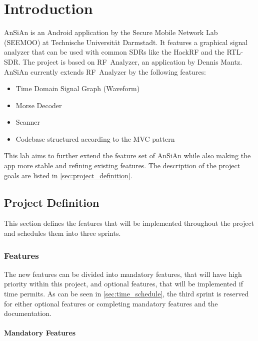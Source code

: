 \chapter{Introduction}\label{ch:introduction}
\glsresetall %

\ac{AnSiAn} is an Android application by the Secure Mobile Network Lab (SEEMOO) at 
Technische Universität Darmstadt. It features a graphical signal analyzer that can be used with common \acp{SDR} like the
HackRF and the RTL-SDR. The project is based on RF~Analyzer, an application by
Dennis Mantz. \ac{AnSiAn} currently extends RF~Analyzer by the following features: 
\begin{itemize}
	\item Time Domain Signal Graph (Waveform)
	\item Morse Decoder
	\item Scanner
	\item Codebase structured according to the \ac{MVC} pattern
\end{itemize}

This lab aims to further extend the feature set of \ac{AnSiAn} while also
making the app more stable and refining existing features. The description of
the project goals are listed in \autoref{sec:project_definition}.


\section{Project Definition\label{sec:project_definition}}

This section defines the features that will be implemented throughout the
project and schedules them into three sprints.

\subsection{Features}

The new features can be divided into mandatory features, that will have high
priority within this project, and optional features, that will be implemented
if time permits. As can be seen in \autoref{sec:time_schedule}, the third
sprint is reserved for either optional features or completing mandatory
features and the documentation.

\subsubsection{Mandatory Features}

